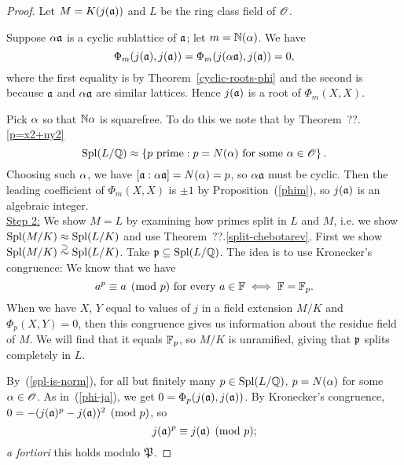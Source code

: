 \begin{proof}
Let $M=K(j(\mathfrak{a}))$ and $L$ be the ring class field of $\mathscr{O}$. 

Suppose $\alpha\mathfrak{a}$ is a cyclic sublattice of $\mathfrak{a}$; let $m=\mathbb{N}(\alpha)$. We have
\begin{equation}
\label{phi-ja}
\Phi_m(j(\mathfrak{a}),j(\mathfrak{a}))=\Phi_m(j(\alpha\mathfrak{a}),j(\mathfrak{a}))=0,
\end{equation}
where the first equality is by Theorem~\ref{cyclic-roots-phi} and the second is because $\mathfrak{a}$ and $\alpha\mathfrak{a}$ are similar lattices. Hence $j(\mathfrak{a})$ is a root of $\Phi_m(X,X)$.

Pick $\alpha$ so that $\mathbb{N}\alpha$ is squarefree. 
To do this we note that by Theorem~??.\ref{p=x2+ny2}
\begin{equation}\label{spl-is-norm}
\operatorname{Spl}(L/\mathbb{Q})\approx \left\{{p\text{ prime}}:{p=N(\alpha)\text{ for some }\alpha\in \mathscr{O}}\right\}.
\end{equation}
Choosing such $\alpha$, we have $[\mathfrak{a}:\alpha\mathfrak{a}]=N(\alpha)=p$, so $\alpha\mathfrak{a}$ must be cyclic. Then the leading coefficient of $\Phi_m(X,X)$ is $\pm 1$ by Proposition~(\ref{phim}), so $j(\mathfrak{a})$ is an algebraic integer.\\

\noindent\underline{Step 2:} 
We show $M= L$ by examining how primes split in $L$ and $M$, i.e. we show $\operatorname{Spl}(M/K)\approx \operatorname{Spl}(L/K)$ and use Theorem~??.\ref{split-chebotarev}. First we show $\operatorname{Spl}(M/K)\stackrel{\supset}{\sim} \operatorname{Spl}(L/K)$. 
Take $\mathfrak{p}\subseteq \operatorname{Spl}(L/\mathbb{Q})$. The idea is to use Kronecker's congruence: We know that we have 
\begin{equation}\label{fermat-iff-p}
a^p\equiv a\pmod{p}\text{ for every }a\in \mathbb{F}\iff  \mathbb{F}=\mathbb{F}_p.
\end{equation}
When we have $X$, $Y$ equal to values of $j$ in a field extension $M/K$ and $\Phi_p(X,Y)=0$, then this congruence gives us information about the residue field of $M$. %
We will find that it equals $\mathbb{F}_p$, so $M/K$ is unramified, giving that $\mathfrak{p}$ splits completely in $L$.

By~(\ref{spl-is-norm}), for all but finitely many $p\in \operatorname{Spl}(L/\mathbb{Q})$, $p=N(\alpha)$ for some $\alpha\in \mathscr{O}$. As in~(\ref{phi-ja}), we get $0=\Phi_p(j(\mathfrak{a}),j(\mathfrak{a}))$. 
By Kronecker's congruence, $0=-(j(\mathfrak{a})^p-j(\mathfrak{a}))^2\pmod{p}$, so
\begin{equation}\label{kronecker-ja}
j(\mathfrak{a})^p\equiv j(\mathfrak{a})\pmod{p};
\end{equation}
{\it a fortiori} this holds modulo $\mathfrak{P}$.


\end{proof}
